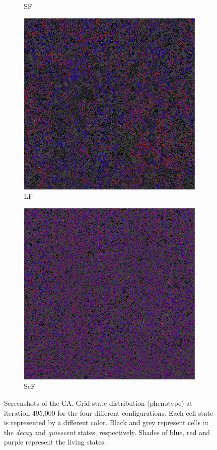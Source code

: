 \begin{figure}
\begin{subfigure}{.25\textwidth}
 \caption{SF}
\end{subfigure}
\begin{subfigure}{.25\textwidth}
 \centering
 \includegraphics[width=.9\linewidth]{img/light495000}
 \caption{LF}
\end{subfigure}%
\begin{subfigure}{.25\textwidth}
 \centering
 \includegraphics[width=.9\linewidth]{img/small495000}
 \caption{ScF}
\end{subfigure}
\caption{Screenshots of the CA. Grid state distribution (phenotype) at iteration 495,000 for the four different configurations. Each cell state is represented by a different color. Black and grey represent cells in the \emph{decay} and \emph{quiescent} states, respectively. Shades of blue, red and purple represent the living states.}
\label{fig:phenoexpl}
\end{figure}

